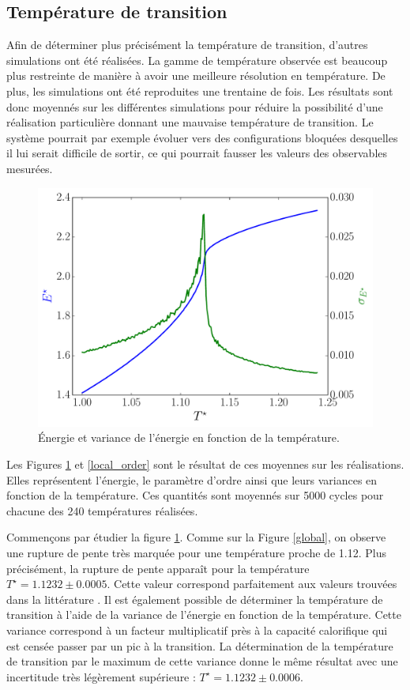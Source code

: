 \documentclass[11pt]{article}
\numberwithin{equation}{section}
\begin{document}
\subsection{Température de transition}
\label{temptrans}
Afin de déterminer plus précisément la température de transition, d'autres simulations ont été réalisées. La gamme de température observée est beaucoup plus restreinte de manière à avoir une meilleure résolution en température. De plus, les simulations ont été reproduites une trentaine de fois. Les résultats sont donc moyennés sur les différentes simulations pour réduire la possibilité d'une réalisation particulière donnant une mauvaise température de transition. Le système pourrait par exemple évoluer vers des configurations bloquées desquelles il lui serait difficile de sortir, ce qui pourrait fausser les valeurs des observables mesurées.   

\begin{figure}[h!]
    \centering	    
	\includegraphics[scale=0.6]{figures/local_energie.pdf}
    \caption{Énergie et variance de l'énergie en fonction de la température.}
    	\label{local_energie} 
\end{figure}
\medskip

Les Figures \ref{local_energie} et \ref{local_order} sont le résultat de ces moyennes sur les réalisations. Elles représentent l'énergie, le paramètre d'ordre ainsi que leurs variances en fonction de la température. Ces quantités sont moyennés sur 5000 cycles pour chacune des 240 températures réalisées.
\medskip

Commençons par étudier la figure \ref{local_energie}. Comme sur la Figure \ref{global}, on observe une rupture de pente très marquée pour une température proche de 1.12. Plus précisément, la rupture de pente apparaît pour la température $T^\star = 1.1232 \pm 0.0005$. Cette valeur correspond parfaitement aux valeurs trouvées dans la littérature \cite{fabbri,wfo, parallel, badass}. Il est également possible de déterminer la température de transition à l'aide de la variance de l'énergie en fonction de la température. Cette variance correspond à un facteur multiplicatif près à la capacité calorifique qui est censée passer par un pic à la transition. La détermination de la température de transition par le maximum de cette variance donne le même résultat avec une incertitude très légèrement supérieure : $T^\star = 1.1232 \pm 0.0006$.
\end{document}
